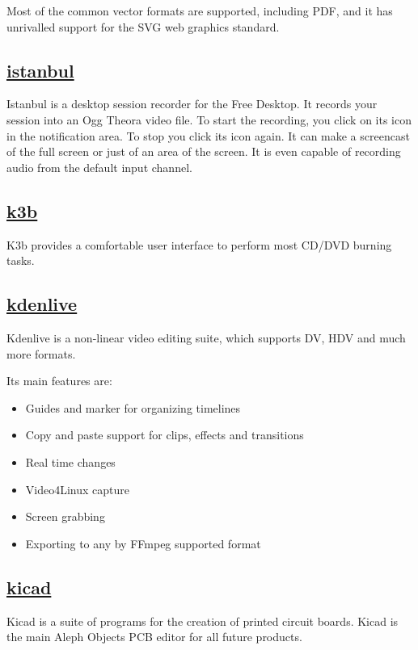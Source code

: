  Most of the common vector formats are supported, including PDF,
 and it has unrivalled support for the
 SVG web graphics standard.

\subsection{\href{http://live.gnome.org/Istanbul}{istanbul}}

 Istanbul is a desktop session recorder for the Free Desktop.
 It records your session into an Ogg Theora video file.
 To start the recording, you click on its icon in the
 notification area. To stop you click its icon again.
 It can make a screencast of the full screen or just of an
 area of the screen. It is even capable of recording audio
 from the default input channel.
 
\subsection{\href{http://www.k3b.org}{k3b}}

 K3b provides a comfortable user interface to perform most CD/DVD burning
 tasks.

\subsection{\href{http://www.kdenlive.org/}{kdenlive}}

 Kdenlive is a non-linear video editing suite, which supports DV, HDV and
 much more formats.

 Its main features are:

\begin{itemize}
 \item Guides and marker for organizing timelines
 \item Copy and paste support for clips, effects and transitions
 \item Real time changes
 \item Video4Linux capture
 \item Screen grabbing
 \item Exporting to any by FFmpeg supported format
\end{itemize}

\subsection{\href{http://www.kicad-pcb.org}{kicad}}

Kicad is a suite of programs for the creation of printed circuit boards.
Kicad is the main Aleph Objects PCB editor for all future products.

